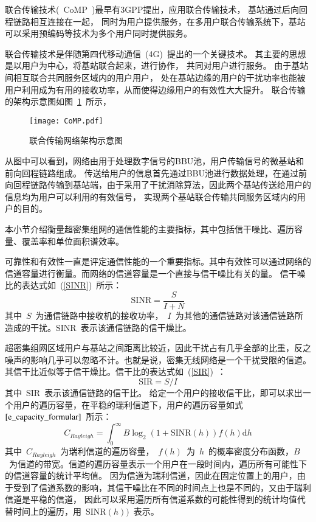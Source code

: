 
联合传输技术(~CoMP~)最早有3GPP提出，应用联合传输技术，
基站通过后向回程链路相互连接在一起，
同时为用户提供服务，在多用户联合传输系统下，基站可以采用预编码等技术为多个用户同时提供服务。

联合传输技术是伴随第四代移动通信~(4G)~提出的一个关键技术。
其主要的思想是以用户为中心，将基站联合起来，进行协作，
共同对用户进行服务。
由于基站间相互联合共同服务区域内的用户用户，
处在基站边缘的用户的干扰功率也能被用户利用成为有用的接收功率，从而使得边缘用户的有效性大大提升。
联合传输的架构示意图如图~\ref{CoMP}~所示，
\begin{figure}[htbp]
\centering
\texttt{[image: CoMP.pdf]}
\caption{联合传输网络架构示意图}\vspace{-0.5em}
\label{CoMP}
\end{figure}
从图中可以看到，网络由用于处理数字信号的BBU池，用户传输信号的微基站和前向回程链路组成。
传送给用户的信息首先通过BBU池进行数据处理，在通过前向回程链路传输到基站端，由于采用了干扰消除算法，因此两个基站传送给用户的信息均为用户可以利用的有效信号，
实现两个基站联合传输共同服务区域内的用户的目的。


本小节介绍衡量超密集组网的通信性能的主要指标，其中包括信干噪比、遍历容量、覆盖率和单位面积谱效率。


可靠性和有效性一直是评定通信性能的一个重要指标。其中有效性可以通过网络的信道容量进行衡量。而网络的信道容量是一个直接与信干噪比有关的量。
信干噪比的表达式如~(\ref{SINR})~所示：
\begin{equation}\label{SINR}
  \mathrm{SINR}=\frac{S}{I+N}
\end{equation}
其中~$S$~为通信链路中接收机的接收功率，~$I$~为其他的通信链路对该通信链路所造成的干扰。$\mathrm{SINR}$~表示该通信链路的信干燥比。

超密集组网区域用户与基站之间距离比较近，因此干扰占有几乎全部的比重，反之噪声的影响几乎可以忽略不计。也就是说，密集无线网络是一个干扰受限的信道。其信干比近似等于信干燥比。信干比的表达式如~(\ref{SIR})~：
\begin{equation}\label{SIR}
  \mathrm{SIR}=S/I
\end{equation}
其中~$\mathrm{SIR}$~表示该通信链路的信干比。
给定一个用户的接收信干比，即可以求出一个用户的遍历容量，在平稳的瑞利信道下，用户的遍历容量如式~$\ref{e_capacity_formular}$~所示：
\begin{equation}\label{e_capacity_formular}
  C_{Rayleigh} = \int_{0}^{\infty} B \log_2(1+\mathrm{SINR}(h)) f(h) \mathrm{d} h
\end{equation}
其中~$C_{Rayleigh}$~为瑞利信道的遍历容量，~$f(h)$~为~$h$~的概率密度分布函数，$B$~为信道的带宽。信道的遍历容量表示一个用户在一段时间内，遍历所有可能性下的信道容量的统计平均值。
因为信道为瑞利信道，因此在固定位置上的用户，由于受到了信道系数的影响，其信干噪比在不同的时间点上也是不同的，又由于瑞利信道是平稳的信道，
因此可以采用遍历所有信道系数的可能性得到的统计均值代替时间上的遍历，用~$\mathrm{SINR}(h))$~表示。

